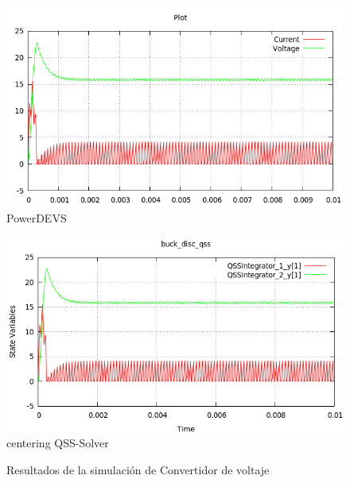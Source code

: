 \documentclass{beamer}
\begin{document}
\begin{frame}
\begin{figure}[H]
\begin{minipage}{0.5\textwidth}
 \includegraphics[width=\linewidth]{buck_disk-pd}
\centering
PowerDEVS
\end{minipage}\hfill
\begin{minipage}{0.5\textwidth}
 \includegraphics[width=\linewidth]{buck_disk-qss}
centering
QSS-Solver
\end{minipage}
\caption{Resultados de la simulación de Convertidor de voltaje}
\label{result:buckdisk}
\end{figure}
\end{frame}
\end{document}
